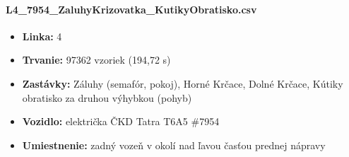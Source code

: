 \paragraph{L4\_7954\_ZaluhyKrizovatka\_KutikyObratisko.csv}
	\begin{itemize}[noitemsep, topsep=0pt]
  	\item \textbf{Linka:} 4
  	\item \textbf{Trvanie:} 97362 vzoriek (194,72 s)
  	\item \textbf{Zastávky:} Záluhy (semafór, pokoj),  Horné Krčace, Dolné Krčace, Kútiky obratisko za druhou výhybkou (pohyb)
  	\item \textbf{Vozidlo:} električka ČKD Tatra T6A5 \#7954
  	\item \textbf{Umiestnenie:} zadný vozeň v okolí nad ľavou časťou prednej nápravy
  	\end{itemize}